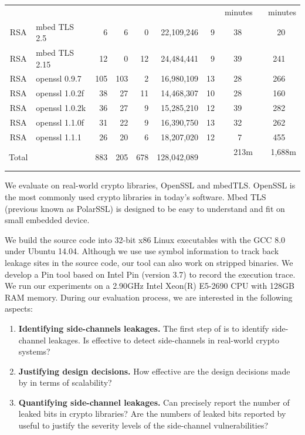 \begin{table}
\begin{tabular}{clrrrrrrr}
&&&&&&& minutes & minutes\\\cline{8-9}
RSA & mbed TLS 2.5   & 6 & 6 & 0 & 22,109,246 & 9      & 38 ~~& 20  ~~\\
RSA & mbed TLS 2.15  & 12 & 0 & 12 & 24,484,441 & 9    & 39 ~~& 241  ~~\\
RSA & openssl 0.9.7  & 105 & 103 & 2 & 16,980,109 & 13 & 28 ~~& 266 ~~\\
RSA & openssl 1.0.2f & 38 & 27 & 11 & 14,468,307 & 10  & 28 ~~& 160  ~~\\
RSA & openssl 1.0.2k & 36 & 27 & 9 & 15,285,210 & 12   & 39 ~~& 282   ~~\\
RSA & openssl 1.1.0f & 31 & 22 & 9 & 16,390,750 & 13   & 32 ~~& 262 ~~\\
RSA & openssl 1.1.1  & 26 & 20 & 6 & 18,207,020 & 12   &  7 ~~& 455 ~~\\\hline
Total &              & 883 &205& 678& 128,042,089&     & 213m    ~~& 1,688m ~~\\\hline
\end{tabular}
\end{table}

We evaluate \tool{} on real-world crypto libraries, 
OpenSSL and mbedTLS. 
OpenSSL is the most commonly used
crypto libraries in today's software. 
Mbed TLS (previous known as PolarSSL) is designed to 
be easy to understand and fit on small embedded device.


We build the source code into 32-bit x86 Linux executables with the 
GCC 8.0 under Ubuntu 14.04. Although we use use symbol information to track
back leakage sites in the source code, our tool can also
work on stripped binaries. We develop a Pin tool based on Intel Pin (version 3.7)
to record the execution trace. We run our experiments on a 2.90GHz
Intel Xeon(R) E5-2690 CPU with 128GB RAM memory.
During our evaluation process, we are interested in the following 
aspects:
\begin{enumerate}
    \item  \textbf{Identifying side-channels leakages.}
    The first step of \tool{} is to identify side-channel leakages. 
    Is \tool{} effective to detect side-channels in real-world
    crypto systems?
    \item  \textbf{Justifying design decisions.} How effective are
    the design decisions made by \tool{} in terms of scalability?  
    \item  \textbf{Quantifying side-channel leakages.}
    Can \tool{} precisely report the number of leaked bits in crypto libraries?
    Are the numbers of leaked bits reported by \tool{} useful to justify 
    the severity levels of the side-channel vulnerabilities?
   
\end{enumerate}

